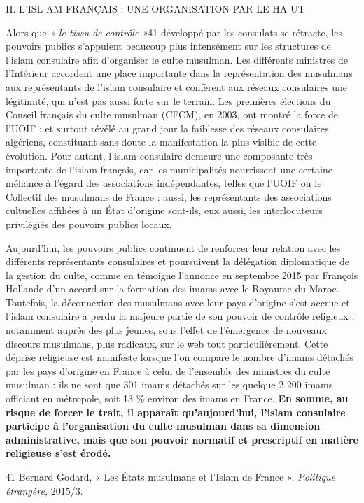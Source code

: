II. L'ISL AM FRANÇAIS : UNE ORGANISATION PAR LE HA UT

Alors que \emph{« le tissu de contrôle »}41 développé par les consulats
se rétracte, les pouvoirs publics s'appuient beaucoup plus intensément
sur les structures de l'islam consulaire afin d'organiser le culte
musulman. Les différents ministres de l'Intérieur accordent une place
importante dans la représentation des musulmans aux représentants de
l'islam consulaire et confèrent aux réseaux consulaires une légitimité,
qui n'est pas aussi forte sur le terrain. Les premières élections du
Conseil français du culte musulman (CFCM), en 2003, ont montré la force
de l'UOIF ; et surtout révélé au grand jour la faiblesse des réseaux
consulaires algériens, constituant sans doute la manifestation la plus
visible de cette évolution. Pour autant, l'islam consulaire demeure une
composante très importante de l'islam français, car les municipalités
nourrissent une certaine méfiance à l'égard des associations
indépendantes, telles que l'UOIF ou le Collectif des musulmans de France
: aussi, les représentants des associations cultuelles affiliées à un
État d'origine sont-ils, eux aussi, les interlocuteurs privilégiés des
pouvoirs publics locaux.

Aujourd'hui, les pouvoirs publics continuent de renforcer leur relation
avec les différents représentants consulaires et poursuivent la
délégation diplomatique de la gestion du culte, comme en témoigne
l'annonce en septembre 2015 par François Hollande d'un accord sur la
formation des imams avec le Royaume du Maroc. Toutefois, la déconnexion
des musulmans avec leur pays d'origine s'est accrue et l'islam
consulaire a perdu la majeure partie de son pouvoir de contrôle
religieux ; notamment auprès des plus jeunes, sous l'effet de
l'émergence de nouveaux discours musulmans, plus radicaux, sur le web
tout particulièrement. Cette déprise religieuse est manifeste lorsque
l'on compare le nombre d'imams détachés par les pays d'origine en France
à celui de l'ensemble des ministres du culte musulman : ils ne sont que
301 imams détachés sur les quelque 2 200 imams officiant en métropole,
soit 13 \% environ des imams en France. \textbf{En somme, au risque de
forcer le trait, il apparaît qu'aujourd'hui, l'islam consulaire
participe à l'organisation du culte musulman dans sa dimension
administrative, mais que son pouvoir normatif et prescriptif en matière
religieuse s'est érodé.}

41 Bernard Godard, « Les États musulmans et l'Islam de France »,
\emph{Politique étrangère,} 2015/3.




